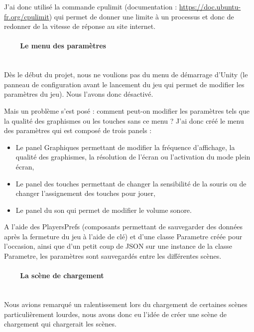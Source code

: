 \documentclass[titlepage, 13px, a4paper]{report}
\begin{document}
J’ai donc utilisé la commande cpulimit (documentation : \url{https://doc.ubuntu-fr.org/cpulimit}) qui permet de donner une 
limite à un processus et donc de redonner de la vitesse de réponse au site internet. \\


\paragraph{~~~~Le menu des paramètres} \hspace{0pt} \\
Dès le début du projet, nous ne voulions pas du menu de démarrage d’Unity (le panneau de configuration avant 
le lancement du jeu qui permet de modifier les paramètres du jeu). Nous l’avons donc désactivé.

Mais un problème s’est posé : comment peut-on modifier les paramètres tels que la qualité des graphismes ou les touches sans ce menu ?
J’ai donc créé le menu des paramètres qui est composé de trois panels : \\
{\begin{itemize}
	\item Le panel Graphiques permettant de modifier la fréquence d’affichage, la qualité des graphismes, la résolution 
	de l’écran ou l’activation du mode plein écran,
	\item Le panel des touches permettant de changer la sensibilité de la souris ou de changer l’assignement des touches pour jouer,
	\item Le panel du son qui permet de modifier le volume sonore. \\
\end{itemize}}
A l’aide des PlayersPrefs (composants permettant de sauvegarder des données après la fermeture du jeu à l’aide de clé) 
et d’une classe Parametre créée pour l’occasion, ainsi que d’un petit coup de JSON sur une instance de la classe Parametre, 
les paramètres sont sauvegardés entre les différentes scènes. \\


\paragraph{~~~~La scène de chargement} \hspace{0pt} \\
Nous avions remarqué un ralentissement lors du chargement de certaines scènes particulièrement lourdes, nous avons donc eu 
l’idée de créer une scène de chargement qui chargerait les scènes.
\end{document}
